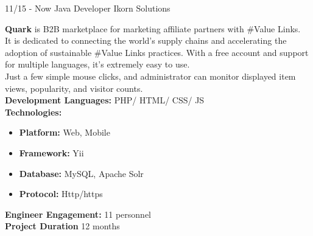 \documentclass[]{friggeri-cv}
\begin{document}
\begin{entrylist}
\entry
    {11/15 - Now}
    {Java Developer}
    {Ikorn Solutions}
	{\textbf{ Quark}  is B2B marketplace for marketing affiliate partners with \#Value Links.\\ 
	It is dedicated to connecting the world’s supply chains and accelerating the adoption of sustainable \#Value Links practices.
	With a free account and support for multiple languages, it’s extremely easy to use.\\
	 Just a few simple mouse clicks, and administrator can monitor displayed item views, popularity, and visitor counts.\\

	 \textbf{Development Languages:} PHP/ HTML/ CSS/ JS\\
	 \textbf{Technologies:}~
			\begin{itemize}
				\item \textbf{Platform:} Web,  Mobile
				\item \textbf{Framework:} Yii
				\item \textbf{Database:} MySQL, Apache Solr
				\item \textbf{Protocol:} Http/https
			\end{itemize}
		 \textbf{Engineer Engagement:} 11 personnel\\
		 \textbf{Project Duration} 12  months~
	}
\end{entrylist}
\end{document}

